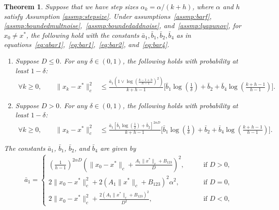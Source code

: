 \documentclass{article}
\newcommand{\lrp}[1]{\left( #1 \right)}
\newcommand{\lrs}[1]{\left[ #1 \right]}
\newtheorem{theorem}{Theorem}[section]
\begin{document}
\begin{theorem}\label{th:ballargumentbound}
Suppose that we have step sizes $\alpha_k=\alpha/(k+h)$, where $\alpha$ and $h$ satisfy Assumption \ref{assmp:stepsize}. Under assumptions~\ref{assmp:barf}, \ref{assmp:boundedmultnoise},~\ref{assmp:boundedaddnoise}, and~\ref{assmp:lyapunov}, for $x_0 \ne x^*$, the following hold with the constants $\bar{a}_1, \bar{b}_1, \bar{b}_2, \bar{b}_4$ as in equations~\eqref{eq:abar1},~\eqref{eq:bar1},~\eqref{eq:bar2}, and~\eqref{eq:bar4}.
\begin{enumerate}
    \item\label{ball_part1_cont} Suppose $D \le 0$. For any $\delta\in(0,1)$, the following holds with probability at least $1-\delta$: 
    \begin{align*}
        \forall k \ge 0, \qquad   \| x_k - x^*\|^2_c 
        &\leq %
        \frac{\bar{a}_1 \lrp{ 1 \vee \log\left(\frac{k-1+h}{h-1}\right)^2}}{k+h-1} \bigg[\bar{b}_1\log\left(\frac{1}{\delta}\right) + \bar{b}_2 + \bar{b}_4 \log\left(\frac{k+h-1}{h-1}\right)\bigg]. %
    \end{align*}
    \item\label{ball_part1_exp} Suppose $D > 0$. For any $\delta \in (0,1)$, the following holds with probability at least $1-\delta$: 
    \begin{align*}
        \forall k\ge 0, \qquad \| x_k - x^*\|^2_c 
        &\leq %
        \frac{\bar{a}_1 \lrs{\bar{b}_1\log\left(\frac{1}{\delta}\right) + \bar{b}_2 }^{2\alpha D}}{k+h-1} \bigg[\bar{b}_1\log\left(\frac{1}{\delta}\right) + \bar{b}_2 + \bar{b}_4 \log\left(\frac{k+h-1}{h-1}\right)\bigg]. %
    \end{align*}
\end{enumerate}
    The constants $\bar{a}_1$, $\bar{b}_1$, $\bar{b}_2$, and $\bar{b}_4$ are given by 
    \begin{align*}
        &\bar{a}_1 = \begin{cases} \lrp{\frac{1}{h-1}}^{2\alpha D} \lrp{ \|x_0 - x^*\|_c + \frac{A_1 \|x^*\|_c + B_{123}}{D} }^2, & \qquad \text{if } D > 0, \\
        2\|x_0 - x^*\|^2_c + 2(A_1 \|x^*\|_c + B_{123})^2 \alpha^2,&\qquad\text{if } D = 0,\\
        2\|x_0 - x^*\|^2_c + \frac{2(A_1 \|x^*\|_c + B_{123})^2}{D^2},&\qquad\text{if } D < 0,

\end{cases}
\end{align*}
\end{theorem}
\end{document}
